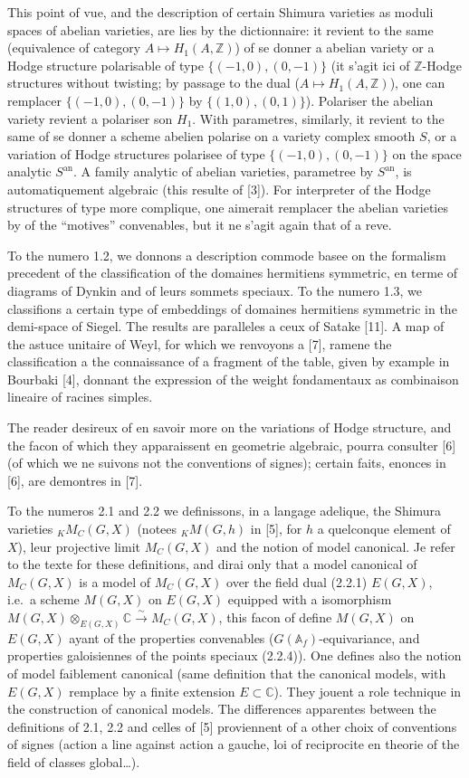 \documentclass[12pt,a4paper]{article}
\theoremstyle{plain}
\theoremstyle{definition}
\theoremstyle{remark}
\newcommand{\ZZ}{\mathbb{Z}}
\newcommand{\CC}{\mathbb{C}}
\newcommand{\Af}{\mathbb{A}_f}
\newcommand{\simto}{\xrightarrow{\sim}}
\begin{document}
This point of vue, and the description of certain Shimura varieties as moduli spaces of abelian varieties, are lies by the dictionnaire: it revient to the same (equivalence of category $A \mapsto H_1(A,\ZZ)$) of se donner a abelian variety or a Hodge structure polarisable of type $\{(-1,0),(0,-1)\}$ (it s'agit ici of $\ZZ$-Hodge structures without twisting; by passage to the dual ($A \mapsto H_1(A,\ZZ)$), one can remplacer $\{(-1,0),(0,-1)\}$ by $\{(1,0),(0,1)\}$). Polariser the abelian variety revient a polariser son $H_1$. With parametres, similarly, it revient to the same of se donner a scheme abelien polarise on a variety complex smooth $S$, or a variation of Hodge structures polarisee of type $\{(-1,0),(0,-1)\}$ on the space analytic $S^{\text{an}}$. A family analytic of abelian varieties, parametree by $S^{\text{an}}$, is automatiquement algebraic (this resulte of [3]). For interpreter of the Hodge structures of type more complique, one aimerait remplacer the abelian varieties by of the ``motives'' convenables, but it ne s'agit again that of a reve.

To the numero 1.2, we donnons a description commode basee on the formalism precedent of the classification of the domaines hermitiens symmetric, en terme of diagrams of Dynkin and of leurs sommets speciaux. To the numero 1.3, we classifions a certain type of embeddings of domaines hermitiens symmetric in the demi-space of Siegel. The results are paralleles a ceux of Satake [11]. A map of the astuce unitaire of Weyl, for which we renvoyons a [7], ramene the classification a the connaissance of a fragment of the table, given by example in Bourbaki [4], donnant the expression of the weight fondamentaux as combinaison lineaire of racines simples.

The reader desireux of en savoir more on the variations of Hodge structure, and the facon of which they apparaissent en geometrie algebraic, pourra consulter [6] (of which we ne suivons not the conventions of signes); certain faits, enonces in [6], are demontres in [7].

To the numeros 2.1 and 2.2 we definissons, in a langage adelique, the Shimura varieties ${}_K M_C(G,X)$ (notees ${}_K M(G,h)$ in [5], for $h$ a quelconque element of $X$), leur projective limit $M_C(G,X)$ and the notion of model canonical. Je refer to the texte for these definitions, and dirai only that a model canonical of $M_C(G,X)$ is a model of $M_C(G,X)$ over the field dual (2.2.1) $E(G,X)$, i.e.~a scheme $M(G,X)$ on $E(G,X)$ equipped with a isomorphism $M(G,X) \otimes_{E(G,X)} \CC \simto M_C(G,X)$, this facon of define $M(G,X)$ on $E(G,X)$ ayant of the properties convenables ($G(\Af)$-equivariance, and properties galoisiennes of the points speciaux (2.2.4)). One defines also the notion of model faiblement canonical (same definition that the canonical models, with $E(G,X)$ remplace by a finite extension $E \subset \CC$). They jouent a role technique in the construction of canonical models. The differences apparentes between the definitions of 2.1, 2.2 and celles of [5] proviennent of a other choix of conventions of signes (action a line against action a gauche, loi of reciprocite en theorie of the field of classes global\dots).
\end{document}
